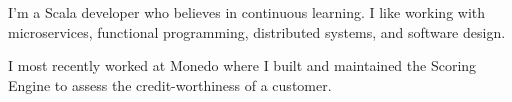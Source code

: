 

\begin{cvparagraph}

I'm a Scala developer who believes in continuous learning. I like working with microservices, functional programming, distributed systems, and software design.

I most recently worked at Monedo where I built and maintained the Scoring Engine to assess the credit-worthiness of a customer.
\end{cvparagraph}
